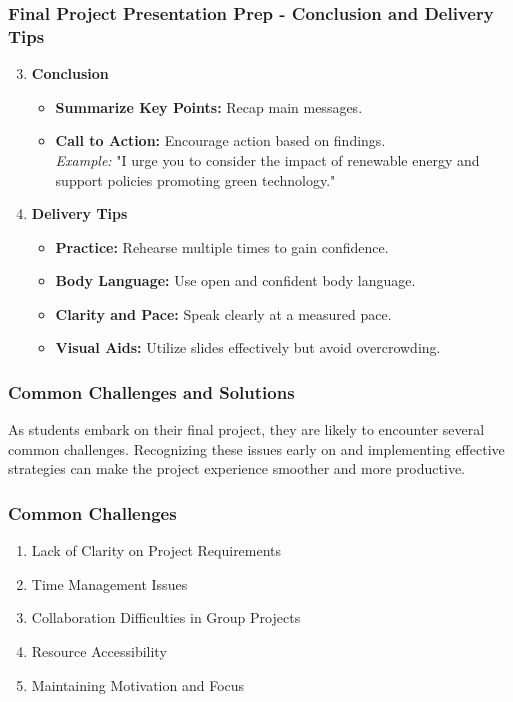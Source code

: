 \documentclass[aspectratio=169]{beamer}
\begin{document}
\begin{frame}[fragile]
    \frametitle{Final Project Presentation Prep - Conclusion and Delivery Tips}
    \begin{enumerate}
        \setcounter{enumi}{2}
        \item \textbf{Conclusion}
            \begin{itemize}
                \item \textbf{Summarize Key Points:} Recap main messages.
                \item \textbf{Call to Action:} Encourage action based on findings.\\
                \textit{Example:} "I urge you to consider the impact of renewable energy and support policies promoting green technology."
            \end{itemize}

        \item \textbf{Delivery Tips}
            \begin{itemize}
                \item \textbf{Practice:} Rehearse multiple times to gain confidence.
                \item \textbf{Body Language:} Use open and confident body language.
                \item \textbf{Clarity and Pace:} Speak clearly at a measured pace.
                \item \textbf{Visual Aids:} Utilize slides effectively but avoid overcrowding.
            \end{itemize}
    \end{enumerate}
\end{frame}

\begin{frame}[fragile]
    \frametitle{Common Challenges and Solutions}
    As students embark on their final project, they are likely to encounter several common challenges. Recognizing these issues early on and implementing effective strategies can make the project experience smoother and more productive. 
\end{frame}

\begin{frame}[fragile]
    \frametitle{Common Challenges}
    \begin{enumerate}
        \item Lack of Clarity on Project Requirements
        \item Time Management Issues
        \item Collaboration Difficulties in Group Projects
        \item Resource Accessibility
        \item Maintaining Motivation and Focus
    \end{enumerate}
\end{frame}
\end{document}
